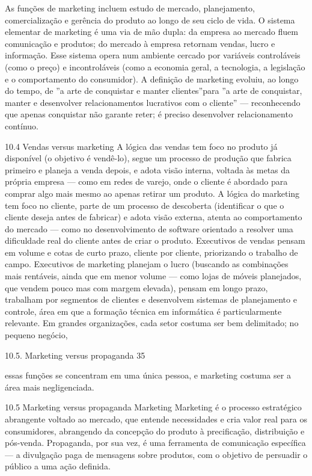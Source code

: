 As funções de marketing incluem estudo de mercado, planejamento, comercialização e gerência do produto ao longo de seu ciclo de vida. O sistema elementar de marketing é uma via de mão dupla: da empresa ao mercado fluem comunicação e produtos; do mercado à empresa retornam vendas, lucro e informação. Esse sistema opera num ambiente cercado por variáveis controláveis (como o preço) e incontroláveis (como a economia geral, a tecnologia, a legislação e o comportamento do consumidor). A definição de marketing evoluiu, ao longo do tempo, de ”a arte de conquistar e manter clientes”para ”a arte de conquistar, manter e desenvolver relacionamentos lucrativos com o cliente” — reconhecendo que apenas conquistar não garante reter; é preciso desenvolver relacionamento contínuo.

10.4 Vendas versus marketing A lógica das vendas tem foco no produto já disponível (o objetivo é vendê-lo), segue um processo de produção que fabrica primeiro e planeja a venda depois, e adota visão interna, voltada às metas da própria empresa — como em redes de varejo, onde o cliente é abordado para comprar algo mais mesmo ao apenas retirar um produto. A lógica do marketing tem foco no cliente, parte de um processo de descoberta (identificar o que o cliente deseja antes de fabricar) e adota visão externa, atenta ao comportamento do mercado — como no desenvolvimento de software orientado a resolver uma dificuldade real do cliente antes de criar o produto. Executivos de vendas pensam em volume e cotas de curto prazo, cliente por cliente, priorizando o trabalho de campo. Executivos de marketing planejam o lucro (buscando as combinações mais rentáveis, ainda que em menor volume — como lojas de móveis planejados, que vendem pouco mas com margem elevada), pensam em longo prazo, trabalham por segmentos de clientes e desenvolvem sistemas de planejamento e controle, área em que a formação técnica em informática é particularmente relevante. Em grandes organizações, cada setor costuma ser bem delimitado; no pequeno negócio,

10.5. Marketing versus propaganda 35

essas funções se concentram em uma única pessoa, e marketing costuma ser a área mais negligenciada.

10.5 Marketing versus propaganda Marketing Marketing é o processo estratégico abrangente voltado ao mercado, que entende necessidades e cria valor real para os consumidores, abrangendo da concepção do produto à precificação, distribuição e pós-venda. Propaganda, por sua vez, é uma ferramenta de comunicação específica — a divulgação paga de mensagens sobre produtos, com o objetivo de persuadir o público a uma ação definida.

